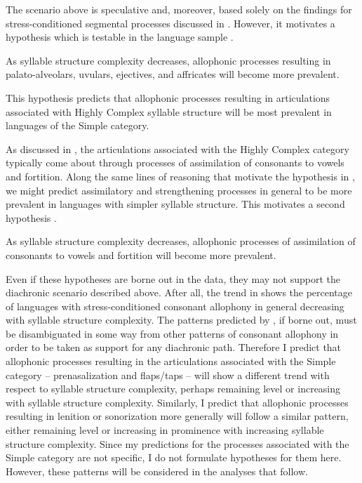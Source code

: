   The scenario above is speculative and, moreover, based solely on the findings for stress-conditioned segmental processes discussed in . However, it motivates a hypothesis which is testable in the language sample .

\ea\label{ex:7.1}
  As syllable structure complexity decreases, allophonic processes resulting in palato-alveolars, uvulars, ejectives, and affricates will become more prevalent.
\z

This hypothesis predicts that allophonic processes resulting in articulations associated with Highly Complex syllable structure will be most prevalent in languages of the Simple category.

  As discussed in , the articulations associated with the Highly Complex category typically come about through processes of assimilation of consonants to vowels and fortition. Along the same lines of reasoning that motivate the hypothesis in , we might predict assimilatory and strengthening processes in general to be more prevalent in languages with simpler syllable structure. This motivates a second hypothesis .

\ea\label{ex:7.2}
  As syllable structure complexity decreases, allophonic processes of assimilation of consonants to vowels and fortition will become more prevalent.
\z

  Even if these hypotheses are borne out in the data, they may not support the diachronic scenario described above. After all, the trend in  shows the percentage of languages with stress-conditioned consonant allophony in general decreasing with syllable structure complexity. The patterns predicted by , if borne out, must be disambiguated in some way from other patterns of consonant allophony in order to be taken as support for any diachronic path. Therefore I predict that allophonic processes resulting in the articulations associated with the Simple category -- prenasalization and flaps/taps -- will show a different trend with respect to syllable structure complexity, perhaps remaining level or increasing with syllable structure complexity. Similarly, I predict that allophonic processes resulting in lenition or sonorization more generally will follow a similar pattern, either remaining level or increasing in prominence with increasing syllable structure complexity. Since my predictions for the processes associated with the Simple category are not specific, I do not formulate hypotheses for them here. However, these patterns will be considered in the analyses that follow.

